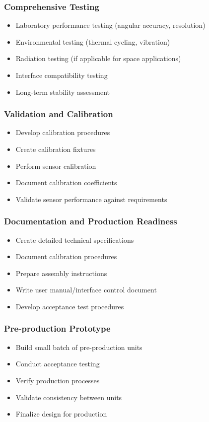\subsubsection*{Comprehensive Testing}
\begin{itemize}
  \item Laboratory performance testing (angular accuracy, resolution)
  \item Environmental testing (thermal cycling, vibration)
  \item Radiation testing (if applicable for space applications)
  \item Interface compatibility testing
  \item Long-term stability assessment
\end{itemize}

\subsubsection*{Validation and Calibration}
\begin{itemize}
  \item Develop calibration procedures
  \item Create calibration fixtures
  \item Perform sensor calibration
  \item Document calibration coefficients
  \item Validate sensor performance against requirements
\end{itemize}

\subsubsection*{Documentation and Production Readiness}
\begin{itemize}
  \item Create detailed technical specifications
  \item Document calibration procedures
  \item Prepare assembly instructions
  \item Write user manual/interface control document
  \item Develop acceptance test procedures
\end{itemize}

\subsubsection*{Pre-production Prototype}
\begin{itemize}
  \item Build small batch of pre-production units
  \item Conduct acceptance testing
  \item Verify production processes
  \item Validate consistency between units
  \item Finalize design for production
\end{itemize}

